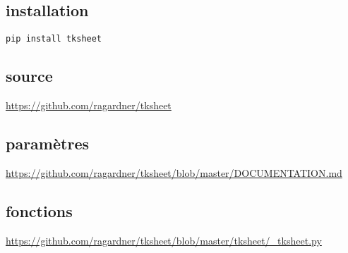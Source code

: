 \documentclass[11pt]{article}
\begin{document}
\subsection{installation}
\label{sec:orge76ca10}
\begin{verbatim}
pip install tksheet
\end{verbatim}

\subsection{source}
\label{sec:org2ef0f1e}
\url{https://github.com/ragardner/tksheet}

\subsection{paramètres}
\label{sec:org8a5c47d}
\url{https://github.com/ragardner/tksheet/blob/master/DOCUMENTATION.md}

\subsection{fonctions}
\label{sec:org67a3041}
\url{https://github.com/ragardner/tksheet/blob/master/tksheet/\_tksheet.py}
\end{document}
